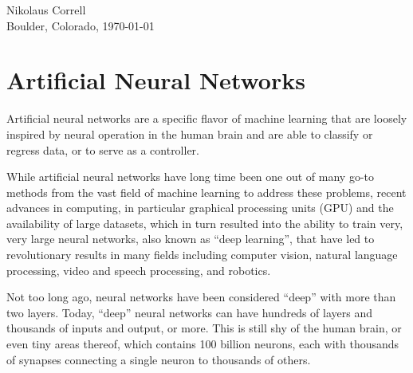 \documentclass[paper=6.14in:9.21in,pagesize=pdftex,11pt,twoside,openright]{scrbook}
\begin{document}
\begin{flushright}
Nikolaus Correll\\
Boulder, Colorado, \today
\end{flushright}


















\chapter{Artificial Neural Networks}
Artificial neural networks are a specific flavor of machine learning that are loosely inspired by neural operation in the human brain and are able to classify or regress data, or to serve as a controller.

While artificial neural networks have long time been one out of many go-to methods from the vast field of machine learning to address these problems, recent advances in computing, in particular graphical processing units (GPU) and the availability of large datasets, which in turn resulted into the ability to train very, very large neural networks, also known as ``deep learning'', that have led to revolutionary results in many fields including computer vision, natural language processing, video and speech processing, and robotics.

Not too long ago, neural networks have been considered ``deep'' with more than two layers. Today, ``deep'' neural networks can have hundreds of layers and thousands of inputs and output, or more. This is still shy of the human brain, or even tiny areas thereof, which contains 100 billion neurons, each with thousands of synapses connecting a single neuron to thousands of others.
\end{document}
